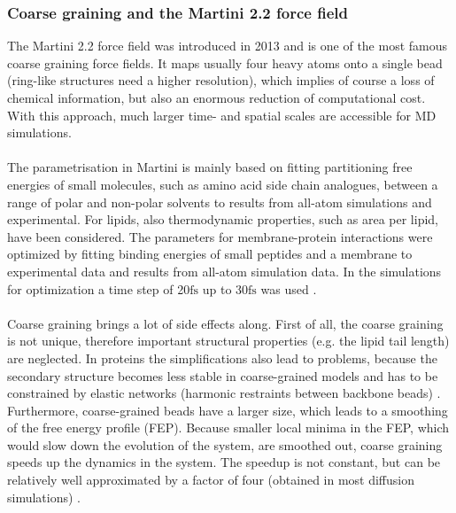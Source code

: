 \subsubsection{Coarse graining and the Martini 2.2 force field}
\label{subsub:coarsegraining}
The Martini 2.2 \autocites{martini22_lipids}{martini22} force field was introduced in 2013 and is one of the most famous coarse graining force fields.
It maps usually four heavy atoms onto a single bead (ring-like structures need a higher resolution), which implies of course a loss of chemical information, but also an enormous reduction of computational cost. With this approach, much larger time- and spatial scales are accessible for MD simulations.\\
\\
The parametrisation in Martini is mainly based on fitting partitioning free energies of small molecules, such as amino acid side chain analogues, between a range of polar and non-polar solvents to results from all-atom simulations and experimental. For lipids, also thermodynamic properties, such as area per lipid, have been considered. The parameters for membrane-protein interactions were optimized by fitting binding energies of small peptides and a membrane to experimental data and results from all-atom simulation data. In the simulations for optimization a time step of 20$\si{\femto\second}$ up to 30$\si{\femto\second}$ was used \autocites{martini22}{martini22_lipids}.\\
\\
Coarse graining brings a lot of side effects along. First of all, the coarse graining is not unique, therefore important structural properties (e.g. the lipid tail length) are neglected.
In proteins the simplifications also lead to problems, because the secondary structure becomes less stable in coarse-grained models and has to be constrained by elastic networks (harmonic restraints between backbone beads) \autocite[p. 6812]{martini22_check}.\\
Furthermore, coarse-grained beads have a larger size, which leads to a smoothing of the free energy profile (FEP). Because smaller local minima in the FEP, which would slow down the evolution of the system, are smoothed out, coarse graining speeds up the dynamics in the system. The speedup is not constant, but can be relatively well approximated by a factor of four (obtained in most diffusion simulations) \autocites[p. 6810]{martini22_check}[p. 7815]{martini}.\\
